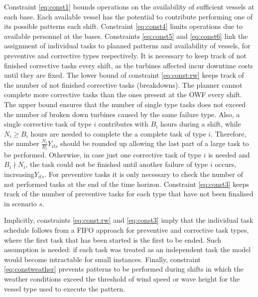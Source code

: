 %
Constraint \eqref{eq:const1} bounds operations on the availability of sufficient vessels at each base. Each available vessel has the potential to contribute performing one of its possible patterns each shift.
Constraint \eqref{eq:const4} limits operations due to available personnel at the bases.
Constraints \eqref{eq:const5} and \eqref{eq:const6} link the assignment of individual tasks to planned patterns and availability of vessels, for preventive and corrective types respectively. It is necessary to keep track of not finished corrective tasks every shift, as the turbines affected incur downtime costs until they are fixed.
The lower bound of constraint \eqref{eq:const:rw} keeps track of the number of not finished corrective tasks (breakdowns). The planner cannot complete more corrective tasks than the ones present at the OWF every shift. The upper bound ensures that the number of single type tasks does not exceed the number of broken down turbines caused by the same failure type. Also, a single corrective task of type $i$  contributes with $B_i$ hours during a shift, while $N_i\geq B_i$ hours are needed to complete the a complete task of type $i$. Therefore, the number $\frac{N_i}{B_i}Y_{its}$ should be rounded up allowing the last part of a large task to be performed. Otherwise, in case just one corrective task of type $i$ is needed and $B_i\nmid N_i$, the task could not be finished until another failure of type $i$ occurs, increasing$Y_{its}$. For preventive tasks it is only necessary to check the number of not performed tasks at the end of the time horizon. Constraint \eqref{eq:const3} keeps track of the number of preventive tasks for each type that have not been finalised in scenario $s$.

Implicitly, constraints \eqref{eq:const:rw} and \eqref{eq:const3} imply that the individual task schedule follows from a FIFO approach for preventive and corrective task types, where the first task that has been started is the first to be ended. Such assumption is needed: if each task was treated as an independent task the model would become intractable for small instances. Finally, constraint \ref{eq:constweather} prevents patterns to be performed during shifts in which the weather conditions exceed the threshold of wind speed or wave height for the vessel type used to execute the pattern.



